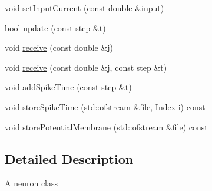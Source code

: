 \begin{DoxyCompactItemize}
\item 
void \hyperlink{classNeuron_a098ab2d61d98e2288e1f42c27717f0e0}{set\-Input\-Current} (const double \&input)
\item 
bool \hyperlink{classNeuron_ad733fecb0aae045ce60263052eb65bb0}{update} (const step \&t)
\item 
void \hyperlink{classNeuron_a7cc4e1e35efede28d44514dd02b8835b}{receive} (const double \&j)
\item 
void \hyperlink{classNeuron_adcdfedb8a0bc2fdbc4b51abb31f332ab}{receive} (const double \&j, const step \&t)
\item 
void \hyperlink{classNeuron_a9dd27e38090ecb4ea8cb964e49d98584}{add\-Spike\-Time} (const step \&t)
\item 
void \hyperlink{classNeuron_a09f81290a1e5a314e0de8582b8ba2e56}{store\-Spike\-Time} (std\-::ofstream \&file, Index i) const 
\item 
void \hyperlink{classNeuron_ad8d822198b5b577d208ddb1cb2488e27}{store\-Potential\-Membrane} (std\-::ofstream \&file) const 
\end{DoxyCompactItemize}


\subsection{Detailed Description}
A neuron class 

